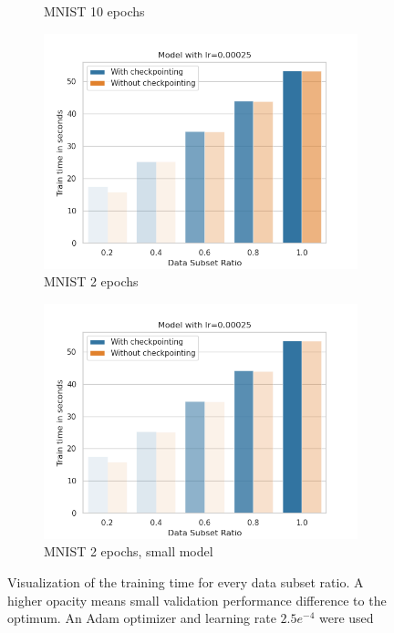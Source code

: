 \begin{figure}[h]
\begin{subfigure}[b]{0.24\textwidth}
        \caption{MNIST 10 epochs}
        \label{fig:7b}
    \end{subfigure}
    \begin{subfigure}[b]{0.24\textwidth}
        \centering
        \includegraphics[width=\textwidth]{figures/22_07/2ep/train_subset_0.00025.png}
        \caption{MNIST 2 epochs}
        \label{fig:7c}
    \end{subfigure}
    \begin{subfigure}[b]{0.24\textwidth}
        \centering
        \includegraphics[width=\textwidth]{figures/22_07/2ep_smaller/train_subset_0.00025.png}
        \caption{MNIST 2 epochs, small model}
        \label{fig:7d}
    \end{subfigure}
    \caption{Visualization of the training time for every data subset ratio. A higher opacity means small validation performance difference to the optimum. An Adam optimizer and learning rate $2.5e^{-4}$ were used}
    \label{fig:7}
\end{figure}

